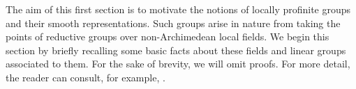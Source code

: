 The aim of this first section is to motivate the notions of locally profinite groups and their smooth representations. Such groups arise in nature from taking the points of reductive groups over non-Archimedean local fields. We begin this section by briefly recalling some basic facts about these fields and linear groups associated to them. For the sake of brevity, we will omit proofs. For more detail, the reader can consult, for example, \cite{Gou1}.






\newpage


